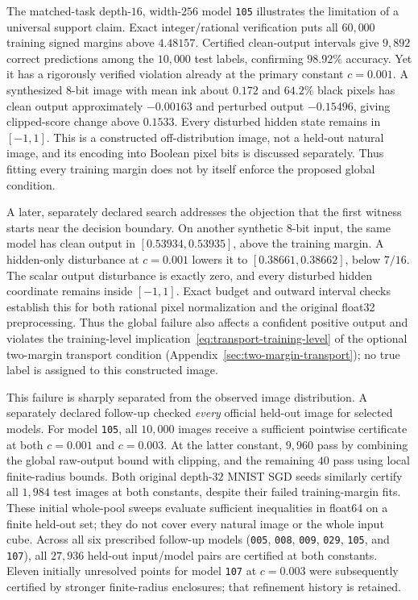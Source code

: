 The matched-task depth-$16$, width-$256$ model \texttt{105} illustrates
the limitation of a universal support claim. Exact integer/rational
verification puts all $60{,}000$ training signed margins above $4.48157$.
Certified clean-output intervals give $9{,}892$ correct predictions among
the $10{,}000$ test labels, confirming $98.92\%$ accuracy. Yet it has a rigorously
verified violation already at the primary constant
$c=0.001$. A synthesized 8-bit image with mean ink about $0.172$ and
$64.2\%$ black pixels has clean output approximately $-0.00163$ and
perturbed output $-0.15496$, giving clipped-score change above $0.1533$.
Every disturbed hidden state remains in $[-1,1]$. This is a constructed
off-distribution image, not a held-out natural image, and its encoding
into Boolean pixel bits is discussed separately. Thus fitting every
training margin does not by itself enforce the proposed global
condition.

A later, separately declared search addresses the objection that the
first witness starts near the decision boundary. On another synthetic
8-bit input, the same model has clean output in
$[0.53934,0.53935]$, above the training margin. A hidden-only disturbance
at $c=0.001$ lowers it to $[0.38661,0.38662]$, below $7/16$.
The scalar output disturbance is exactly zero, and every disturbed
hidden coordinate remains inside $[-1,1]$. Exact budget and outward
interval checks establish this for both rational pixel normalization
and the original float32 preprocessing. Thus the global failure also
affects a confident positive output and violates the training-level
implication~\eqref{eq:transport-training-level} of the optional two-margin
transport condition (Appendix~\ref{sec:two-margin-transport}); no true label is assigned to this
constructed image.

This failure is sharply separated from the observed image distribution.
A separately declared follow-up checked \emph{every} official held-out
image for selected models. For model \texttt{105}, all $10{,}000$ images
receive a sufficient pointwise certificate at both $c=0.001$ and
$c=0.003$. At the latter constant, $9{,}960$ pass by combining the global
raw-output bound with clipping, and the remaining $40$ pass using local
finite-radius bounds. Both original depth-$32$ MNIST SGD seeds similarly
certify all $1{,}984$ test images at both constants, despite their failed
training-margin fits. These initial whole-pool sweeps evaluate sufficient
inequalities in float64 on a finite held-out set; they do not cover every
natural image or the whole input cube.
Across all six prescribed follow-up models
(\texttt{005}, \texttt{008}, \texttt{009}, \texttt{029}, \texttt{105}, and
\texttt{107}), all $27{,}936$ held-out input/model pairs are certified
at both constants. Eleven initially unresolved points for model
\texttt{107} at $c=0.003$ were subsequently certified by stronger
finite-radius enclosures; that refinement history is retained.

